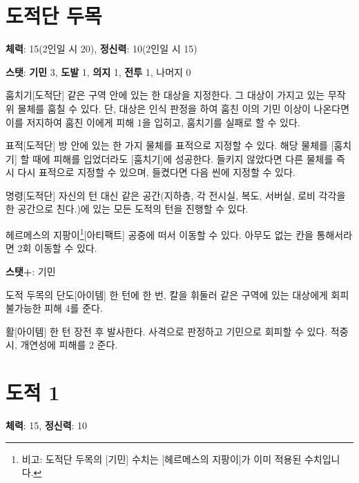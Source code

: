 \documentclass{report}
\begin{document}
	\section*{도적단 두목}
	\textbf{체력}: 15(2인일 시 20), \textbf{정신력}: 10(2인일 시 15)
	
	\textbf{스탯}: \textbf{기민} 3, \textbf{도발} 1, \textbf{의지} 1, \textbf{전투} 1, 나머지 0
	
	\begin{story}{훔치기}{[도적단]}
		같은 구역 안에 있는 한 대상을 지정한다. 그 대상이 가지고 있는 무작위 물체를 훔칠 수 있다. 단, 대상은 인식 판정을 하여 훔친 이의 기민 이상이 나온다면 이를 저지하여 훔친 이에게 피해 1을 입히고, 훔치기를 실패로 할 수 있다.
	\end{story}
	
	\begin{story}{표적}{[도적단]}
		방 안에 있는 한 가지 물체를 표적으로 지정할 수 있다. 해당 물체를 [훔치기] 할 때에 피해를 입었더라도 [훔치기]에 성공한다. 들키지 않았다면 다른 물체를 즉시 다시 표적으로 지정할 수 있으며, 들켰다면 다음 씬에 지정할 수 있다.
	\end{story}
	
	\begin{story}{명령}{[도적단]}
		자신의 턴 대신 같은 공간(지하층, 각 전시실, 복도, 서버실, 로비 각각을 한 공간으로 친다.)에 있는 모든 도적의 턴을 진행할 수 있다.
	\end{story}
	
	\begin{story}{헤르메스의 지팡이\footnote{비고: 도적단 두목의 [기민] 수치는 [헤르메스의 지팡이]가 이미 적용된 수치입니다.}}{[아티팩트]}
		공중에 떠서 이동할 수 있다. 아무도 없는 칸을 통해서라면 2회 이동할 수 있다.
		
		\textbf{스탯+}: 기민
	\end{story}
	
	\begin{story}{도적 두목의 단도}{[아이템]}
		한 턴에 한 번, 칼을 휘둘러 같은 구역에 있는 대상에게 회피 불가능한 피해 4를 준다.
	\end{story}
	
	\begin{story}{활}{[아이템]}
		한 턴 장전 후 발사한다. 사격으로 판정하고 기민으로 회피할 수 있다. 적중시, 개연성에 피해를 2 준다.
	\end{story}
	
	\section*{도적 1}
	\textbf{체력}: 15, \textbf{정신력}: 10
	
\end{document}
